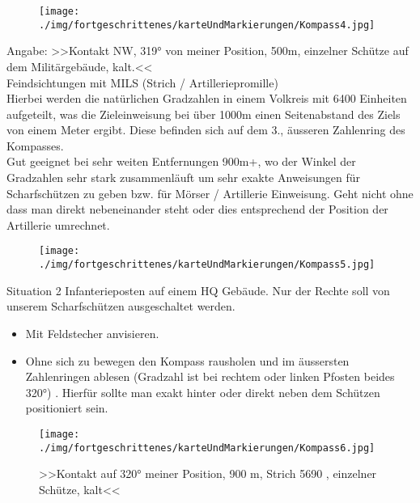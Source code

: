 \begin{figure}[!h]
	\centering
	\texttt{[image: ./img/fortgeschrittenes/karteUndMarkierungen/Kompass4.jpg]}
\end{figure}
Angabe: >>Kontakt NW, 319° von meiner Position, 500m, einzelner Schütze auf dem Militärgebäude, kalt.<<\\

Feindsichtungen mit MILS (Strich / Artilleriepromille) \\

Hierbei werden die natürlichen Gradzahlen in einem Volkreis mit 6400 Einheiten aufgeteilt, was die Zieleinweisung bei über 1000m einen Seitenabstand des Ziels von einem Meter ergibt. Diese befinden sich auf dem 3., äusseren Zahlenring des Kompasses.\\
Gut geeignet bei sehr weiten Entfernungen 900m+, wo der Winkel der Gradzahlen sehr stark zusammenläuft um sehr exakte Anweisungen für Scharfschützen zu geben bzw. für Mörser / Artillerie Einweisung. Geht nicht ohne dass man direkt nebeneinander steht oder dies entsprechend der Position der Artillerie umrechnet.  \\

\begin{figure}[!h]
	\centering
	\texttt{[image: ./img/fortgeschrittenes/karteUndMarkierungen/Kompass5.jpg]}
\end{figure}
Situation 2 Infanterieposten auf einem HQ Gebäude. Nur der Rechte soll von unserem Scharfschützen ausgeschaltet werden.\\
\begin{itemize}
 	\item Mit Feldstecher anvisieren.
	\item Ohne sich zu bewegen den Kompass rausholen und im äussersten Zahlenringen ablesen (Gradzahl ist bei rechtem oder linken Pfosten beides 320°) . Hierfür sollte man exakt hinter oder direkt neben dem Schützen positioniert sein.
	\end{itemize}
\begin{figure}[!h]
	\centering
	\texttt{[image: ./img/fortgeschrittenes/karteUndMarkierungen/Kompass6.jpg]}
	\caption{>>Kontakt auf 320° meiner Position, 900 m, Strich 5690 , einzelner Schütze, kalt<<}
\end{figure}
